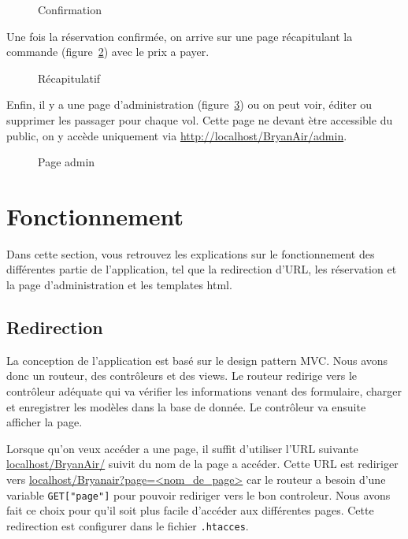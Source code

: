 \documentclass[12pt,a4paper]{article}
\begin{document}
		\begin{figure}
			\caption{Confirmation}
			\label{fig:conf}
		\end{figure}
		Une fois la réservation confirmée, on arrive sur une page récapitulant la commande (figure~\ref{fig:recap}) avec le prix a payer.
		\begin{figure}
			\caption{Récapitulatif}
			\label{fig:recap}
		\end{figure}

		Enfin, il y a une page d'administration (figure~\ref{fig:admin}) ou on peut voir, éditer ou supprimer les passager pour chaque vol. Cette page ne devant ètre accessible du public, on y accède uniquement via \url{http://localhost/BryanAir/admin}.

		\begin{figure}
			\caption{Page admin}
			\label{fig:admin}
		\end{figure}

	\section{Fonctionnement}
		Dans cette section, vous retrouvez les explications sur le fonctionnement des différentes partie de l'application, tel que la redirection d'URL, les réservation et la page d'administration et les templates html.
		\subsection*{Redirection}
		La conception de l'application est basé sur le design pattern MVC. Nous avons donc un routeur, des contrôleurs et des views. Le routeur redirige vers le contrôleur adéquate qui va vérifier les informations venant des formulaire, charger et enregistrer les modèles dans la base de donnée. Le contrôleur va ensuite afficher la page.

		Lorsque qu'on veux accéder a une page, il suffit d'utiliser l'URL suivante \url{localhost/BryanAir/} suivit du nom de la page a accéder. Cette URL est rediriger vers \url{localhost/Bryanair?page=<nom_de_page>} car le routeur a besoin d'une variable \texttt{GET["page"]} pour pouvoir rediriger vers le bon controleur. Nous avons fait ce choix pour qu'il soit plus facile d'accéder aux différentes pages. Cette redirection est configurer dans le fichier \texttt{.htacces}.
\end{document}
